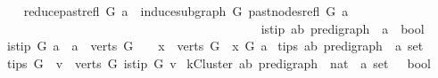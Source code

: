 \begin{isabellebody}
\ \ \ \isanewline
\ \ {\isachardoublequoteopen}reduce{\isacharunderscore}{\kern0pt}past{\isacharunderscore}{\kern0pt}refl\ G\ a\ {\isacharequal}{\kern0pt}\ induce{\isacharunderscore}{\kern0pt}subgraph\ G\ {\isacharparenleft}{\kern0pt}past{\isacharunderscore}{\kern0pt}nodes{\isacharunderscore}{\kern0pt}refl\ G\ a{\isacharparenright}{\kern0pt}{\isachardoublequoteclose}\isanewline
\ \ \ \ \ \ \ \ \ \ \ \ \ \ \ \ \ \ \ \ \ \ \ \ \ \ \ \ \ \ \ \ \ \ \ \ \ \ \ \ \ \ \isanewline
{}\isamarkupfalse%
\ is{\isacharunderscore}{\kern0pt}tip{\isacharcolon}{\kern0pt}{\isacharcolon}{\kern0pt}\ {\isachardoublequoteopen}{\isacharparenleft}{\kern0pt}{\isacharprime}{\kern0pt}a{\isacharcomma}{\kern0pt}{\isacharprime}{\kern0pt}b{\isacharparenright}{\kern0pt}\ pre{\isacharunderscore}{\kern0pt}digraph\ {\isasymRightarrow}\ {\isacharprime}{\kern0pt}a\ {\isasymRightarrow}\ bool{\isachardoublequoteclose}\isanewline
\ \ \ {\isachardoublequoteopen}is{\isacharunderscore}{\kern0pt}tip\ G\ a\ {\isacharequal}{\kern0pt}\ {\isacharparenleft}{\kern0pt}{\isacharparenleft}{\kern0pt}a\ {\isasymin}\ verts\ G{\isacharparenright}{\kern0pt}\ {\isasymand}\ \ {\isacharparenleft}{\kern0pt}{\isasymforall}\ x\ {\isasymin}\ verts\ G{\isachardot}{\kern0pt}\ {\isasymnot}\ x\ {\isasymrightarrow}\isactrlsup {\isacharplus}{\kern0pt}\isactrlbsub G\isactrlesub \ a{\isacharparenright}{\kern0pt}{\isacharparenright}{\kern0pt}{\isachardoublequoteclose}\isanewline
\isanewline
{}\isamarkupfalse%
\ tips{\isacharcolon}{\kern0pt}{\isacharcolon}{\kern0pt}\ {\isachardoublequoteopen}{\isacharparenleft}{\kern0pt}{\isacharprime}{\kern0pt}a{\isacharcomma}{\kern0pt}{\isacharprime}{\kern0pt}b{\isacharparenright}{\kern0pt}\ pre{\isacharunderscore}{\kern0pt}digraph\ {\isasymRightarrow}\ {\isacharprime}{\kern0pt}a\ set{\isachardoublequoteclose}\isanewline
\ \ \ {\isachardoublequoteopen}tips\ G\ {\isacharequal}{\kern0pt}\ {\isacharbraceleft}{\kern0pt}v\ {\isasymin}\ verts\ G{\isachardot}{\kern0pt}\ is{\isacharunderscore}{\kern0pt}tip\ G\ v{\isacharbraceright}{\kern0pt}{\isachardoublequoteclose}\isanewline
\isanewline
{}\isamarkupfalse%
\ kCluster{\isacharcolon}{\kern0pt}{\isacharcolon}{\kern0pt}\ {\isachardoublequoteopen}{\isacharparenleft}{\kern0pt}{\isacharprime}{\kern0pt}a{\isacharcomma}{\kern0pt}{\isacharprime}{\kern0pt}b{\isacharparenright}{\kern0pt}\ pre{\isacharunderscore}{\kern0pt}digraph\ {\isasymRightarrow}\ nat\ {\isasymRightarrow}\ {\isacharprime}{\kern0pt}a\ set\ \ {\isasymRightarrow}\ bool{\isachardoublequoteclose}\isanewline

\end{isabellebody}
